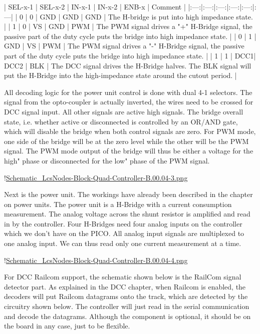| SEL-x-1 | SEL-x-2 | IN-x-1 | IN-x-2 | ENB-x | Comment |
|:---:|:---:|:---:|:---:|:---:|:---|
| 0 | 0 | GND | GND | GND | The H-bridge is put into high impedance state. |
| 1 | 0 | VS | GND | PWM | The PWM signal drives a "+" H-Bridge signal, the passive part of the duty cycle puts the bridge into high impedance state. |
| 0 | 1 | GND | VS | PWM | The PWM signal drives a "-" H-Bridge signal, the passive part of the duty cycle puts the bridge into high impedance state. |
| 1 | 1 | DCC1| DCC2 | BLK | The DCC signal drives the H-Bridge halves. The BLK signal will put the H-Bridge into the high-impedance state around the cutout period. |

All decoding logic for the power unit control is done with dual 4-1 selectors. The signal from the opto-coupler is actually inverted, the wires need to be crossed for DCC signal input. All other signals are active high signals. The bridge overall state, i.e. whether active or disconnected is controlled by an OR/AND gate, which will disable the bridge when both control signals are zero. For PWM mode, one side of the bridge will be at the zero level while the other will be the PWM signal. The PWM mode output of the bridge will thus be either a voltage for the high" phase or disconnected for the low" phase of the PWM signal.

!\href{./Schematics/Schematic_LcsNodes-Block-Quad-Controller-B.00.04-3.png }{Schematic_LcsNodes-Block-Quad-Controller-B.00.04-3.png}

Next is the power unit. The workings have already been described in the chapter on power units. The power unit is a H-Bridge with a current consumption measurement. The analog voltage across the shunt resistor is amplified and read in by the controller. Four H-Bridges need four analog inputs on the controller which we don't have on the PICO. All analog input signals are multiplexed to one analog input. We can thus read only one current measurement at a time.

!\href{./Schematics/Schematic_LcsNodes-Block-Quad-Controller-B.00.04-4.png }{Schematic_LcsNodes-Block-Quad-Controller-B.00.04-4.png}

For DCC Railcom support, the schematic shown below is the RailCom signal detector part. As explained in the DCC chapter, when Railcom is enabled, the decoders will put Railcom datagrams onto the track, which are detected by the circuitry shown below. The controller will just read in the serial communication and decode the datagrams. Although the component is optional, it should be on the board in any case, just to be flexible.

